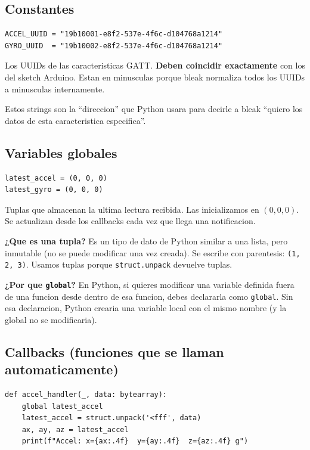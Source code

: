 \documentclass[11pt,a4paper]{article}
\begin{document}
\subsection{Constantes}

\begin{lstlisting}[style=python]
ACCEL_UUID = "19b10001-e8f2-537e-4f6c-d104768a1214"
GYRO_UUID  = "19b10002-e8f2-537e-4f6c-d104768a1214"
\end{lstlisting}

Los UUIDs de las caracteristicas GATT. \textbf{Deben coincidir
exactamente} con los del sketch Arduino. Estan en minusculas porque
bleak normaliza todos los UUIDs a minusculas internamente.

Estos strings son la ``direccion'' que Python usara para decirle a
bleak ``quiero los datos de esta caracteristica especifica''.

\subsection{Variables globales}

\begin{lstlisting}[style=python]
latest_accel = (0, 0, 0)
latest_gyro = (0, 0, 0)
\end{lstlisting}

Tuplas que almacenan la ultima lectura recibida. Las inicializamos
en $(0, 0, 0)$. Se actualizan desde los callbacks cada vez que
llega una notificacion.

\textbf{¿Que es una tupla?} Es un tipo de dato de Python similar a
una lista, pero inmutable (no se puede modificar una vez creada).
Se escribe con parentesis: \texttt{(1, 2, 3)}. Usamos tuplas porque
\texttt{struct.unpack} devuelve tuplas.

\textbf{¿Por que \texttt{global}?} En Python, si quieres modificar
una variable definida fuera de una funcion desde dentro de esa
funcion, debes declararla como \texttt{global}. Sin esa declaracion,
Python crearia una variable local con el mismo nombre (y la global
no se modificaria).

\subsection{Callbacks (funciones que se llaman automaticamente)}

\begin{lstlisting}[style=python]
def accel_handler(_, data: bytearray):
    global latest_accel
    latest_accel = struct.unpack('<fff', data)
    ax, ay, az = latest_accel
    print(f"Accel: x={ax:.4f}  y={ay:.4f}  z={az:.4f} g")
\end{lstlisting}
\end{document}
